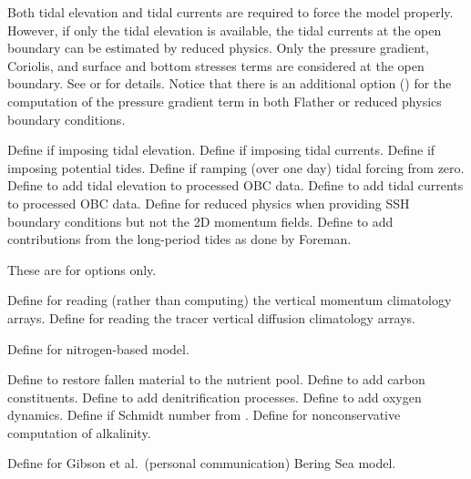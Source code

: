 \begin{klist}
Both tidal elevation and tidal currents are required to force the model
properly. However, if only the tidal elevation is available, the tidal
currents at the open boundary can be estimated by reduced physics.
Only the pressure gradient, Coriolis, and surface and bottom stresses
terms are considered at the open boundary. See  or
 for details. Notice that there is an additional option
() for the computation of the pressure gradient
term in both Flather or reduced physics boundary conditions.
  \begin{klist}
      Define if imposing tidal elevation.
      Define if imposing tidal currents.
      Define if imposing potential tides.
      Define if ramping (over one day) tidal forcing
     from zero.
      Define to add tidal elevation to processed OBC data.
      Define to add tidal currents to processed OBC data.
      Define for reduced physics when
     providing SSH boundary conditions but not the 2D momentum
     fields.
      Define to add contributions from the
     long-period tides as done by Foreman.
  \end{klist}
   These are for  options only.
  \begin{klist}
      Define for reading (rather than computing) the vertical momentum
   climatology arrays.
      Define for reading the tracer
     vertical diffusion climatology arrays.
  \end{klist}
   \mbox{}
  \begin{klist}
     Define for \citet{Fennel_2006}
    nitrogen-based model.
    \begin{klist}
        Define to restore fallen material to the
       nutrient pool.
        Define to add carbon constituents.
        Define to add denitrification processes.
        Define to add oxygen dynamics.
        Define if Schmidt number from
       \citet{Keeling_98}.
        Define for nonconservative computation
       of alkalinity.
    \end{klist}
     Define for Gibson et al.\ (personal communication)
       Bering Sea model.
    \begin{klist}

\end{klist}
\end{klist}
\end{klist}

